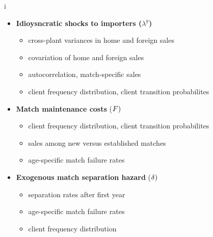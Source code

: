 \documentclass[notes=show]{beamer}
\begin{document}
\begin{frame}%


i

\begin{itemize}
\item \textbf{Idioysncratic shocks to importers (}$\lambda ^{y}$\textbf{)}

\begin{itemize}
\item cross-plant variances in home and foreign sales

\item covariation of home and foreign sales

\item autocorrelation, match-specific sales

\item client frequency distribution, client transition probabilites
\end{itemize}

\item \textbf{Match maintenance costs} (${\small F)}$

\begin{itemize}
\item client frequency distribution, client transition probabilites

\item sales among new versus established matches

\item age-specific match failure rates
\end{itemize}

\item \textbf{Exogenous match separation hazard} (${\small \delta }{\small )}
$

\begin{itemize}
\item separation rates after first year

\item age-specific match failure rates

\item client frequency distribution
\end{itemize}
\end{itemize}

\end{frame}%
\end{document}
